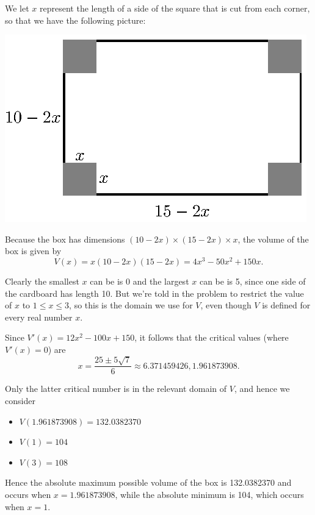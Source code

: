\begin{activitySolution}
\ba
	\item We let $x$ represent the length of a side of the square that is cut from each corner, so that we have the following picture:
	\begin{center}
	\includegraphics{figures/3_3_Act3Soln.eps}
	\end{center}
	\item Because the box has dimensions $(10-2x) \times (15-2x) \times x$, the volume of the box is given by 
	$$V(x) = x (10-2x) (15-2x) = 4x^3 - 50x^2 + 150x.$$
	\item Clearly the smallest $x$ can be is 0 and the largest $x$ can be is 5, since one side of the cardboard has length 10.  But we're told in the problem to restrict the value of $x$ to $1 \le x \le 3$, so this is the domain we use for $V$, even though $V$ is defined for every real number $x$.
	\item Since $V'(x) = 12x^2 - 100x + 150$, it follows that the critical values (where $V'(x) = 0$) are
	$$x = \frac{25 \pm 5\sqrt{7}}{6} \approx 6.371459426, 1.961873908.$$
	\item Only the latter critical number is in the relevant domain of $V$, and hence we consider
	\begin{itemize}
		\item $V(1.961873908) = 132.0382370$
		\item $V(1) = 104$
		\item $V(3) = 108$
	\end{itemize} 
	\item Hence the absolute maximum possible volume of the box is 132.0382370 and occurs when $x = 1.961873908$, while the absolute minimum is 104, which occurs when $x=1$.
\ea
\end{activitySolution}
\aftera